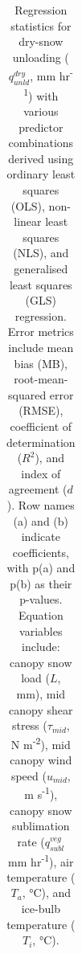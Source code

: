\documentclass[
  letterpaper,
]{tex/uofsthesis-cs}
\begin{document}
\begin{landscape}

\begin{longtable}[]{@{}
  >{\raggedright\arraybackslash}p{}
  >{\raggedright\arraybackslash}p{}
  >{\raggedright\arraybackslash}p{}
  >{\raggedright\arraybackslash}p{}
  >{\raggedright\arraybackslash}p{}
  >{\raggedright\arraybackslash}p{}
  >{\raggedright\arraybackslash}p{}
  >{\raggedright\arraybackslash}p{}@{}}

\caption{\label{tbl-dry-unld}Regression statistics for dry-snow
unloading (\(q_{unld}^{dry}\), mm hr\textsuperscript{-1}) with various
predictor combinations derived using ordinary least squares (OLS),
non-linear least squares (NLS), and generalised least squares (GLS)
regression. Error metrics include mean bias (MB), root-mean-squared
error (RMSE), coefficient of determination (\(R^2\)), and index of
agreement (\(d\)). Row names (a) and (b) indicate coefficients, with
p(a) and p(b) as their p-values. Equation variables include: canopy snow
load (\(L\), mm), mid canopy shear stress (\(\tau_{mid}\), N
m\textsuperscript{-2}), mid canopy wind speed (\(u_{mid}\), m
s\textsuperscript{-1}), canopy snow sublimation rate (\(q_{subl}^{veg}\)
mm hr\textsuperscript{-1}), air temperature (\(T_a\), °C), and ice-bulb
temperature (\(T_i\), °C).}

\tabularnewline


\end{longtable}
\end{landscape}
\end{document}
